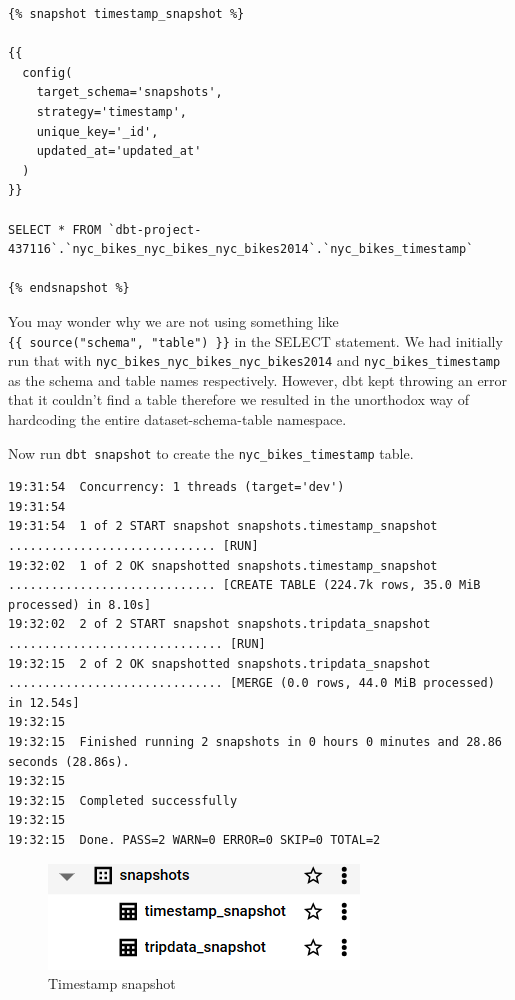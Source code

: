 \documentclass[
]{book}
\begin{document}
\begin{verbatim}
{% snapshot timestamp_snapshot %}

{{
  config(      
    target_schema='snapshots',      
    strategy='timestamp',      
    unique_key='_id',      
    updated_at='updated_at'    
  )  
}}  

SELECT * FROM `dbt-project-437116`.`nyc_bikes_nyc_bikes_nyc_bikes2014`.`nyc_bikes_timestamp`

{% endsnapshot %}
\end{verbatim}

You may wonder why we are not using something like \texttt{\{\{\ source("schema",\ "table")\ \}\}} in the SELECT statement. We had initially run that with \texttt{nyc\_bikes\_nyc\_bikes\_nyc\_bikes2014} and \texttt{nyc\_bikes\_timestamp} as the schema and table names respectively. However, dbt kept throwing an error that it couldn't find a table therefore we resulted in the unorthodox way of hardcoding the entire dataset-schema-table namespace.

Now run \texttt{dbt\ snapshot} to create the \texttt{nyc\_bikes\_timestamp} table.

\begin{verbatim}
19:31:54  Concurrency: 1 threads (target='dev')
19:31:54  
19:31:54  1 of 2 START snapshot snapshots.timestamp_snapshot ............................. [RUN]
19:32:02  1 of 2 OK snapshotted snapshots.timestamp_snapshot ............................. [CREATE TABLE (224.7k rows, 35.0 MiB processed) in 8.10s]
19:32:02  2 of 2 START snapshot snapshots.tripdata_snapshot .............................. [RUN]
19:32:15  2 of 2 OK snapshotted snapshots.tripdata_snapshot .............................. [MERGE (0.0 rows, 44.0 MiB processed) in 12.54s]
19:32:15  
19:32:15  Finished running 2 snapshots in 0 hours 0 minutes and 28.86 seconds (28.86s).
19:32:15  
19:32:15  Completed successfully
19:32:15  
19:32:15  Done. PASS=2 WARN=0 ERROR=0 SKIP=0 TOTAL=2
\end{verbatim}

\begin{figure}
\centering
\includegraphics{./images/timestamp_snapshot_created.png}
\caption{Timestamp snapshot}
\end{figure}
\end{document}
